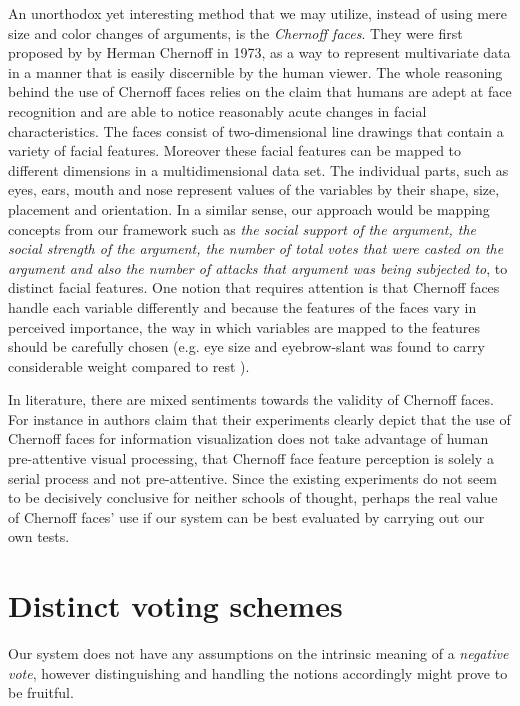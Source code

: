 \documentclass{article}
\begin{document}
An unorthodox yet interesting method that we may utilize, instead of using mere size and color changes of arguments, is the \textit{Chernoff faces}. They were first proposed by by Herman Chernoff \cite{Chernoff73} in 1973, as a way to represent multivariate data in a manner that is easily discernible by the human viewer.  The whole reasoning behind the use of Chernoff faces relies on the claim that humans are adept at face recognition and are able to notice reasonably acute changes in facial characteristics. The faces consist of two-dimensional line drawings that contain a variety of facial features. Moreover these facial features can be mapped to different dimensions in a multidimensional data set. The individual parts, such as eyes, ears, mouth and nose represent values of the variables by their shape, size, placement and orientation. In a similar sense, our approach would be mapping concepts from our framework such as  \textit{the social support of the argument, the social strength of the argument, the number of total votes that were casted on the argument and also the number of attacks that argument was being subjected to}, to distinct facial features. One notion that requires attention is that Chernoff faces handle each variable differently and because the features of the faces vary in perceived importance, the way in which variables are mapped to the features should be carefully chosen (e.g. eye size and eyebrow-slant was found to carry considerable weight compared to rest \cite{Morris00}).

In literature, there are mixed sentiments towards the validity of Chernoff faces. For instance in \cite{Morris00} authors claim that their experiments clearly depict that the use of Chernoff faces for information visualization does not take advantage of human pre-attentive visual processing, that Chernoff face feature perception is solely a serial process and not pre-attentive. Since the existing experiments do not seem to be decisively conclusive for neither schools of thought, perhaps the real value of Chernoff faces' use if our system can be best evaluated by carrying out our own tests.


\section{Distinct voting schemes}
Our system does not have any assumptions on the intrinsic meaning of a \textit{negative vote}, however distinguishing and handling the notions accordingly might prove to be fruitful.
\end{document}
